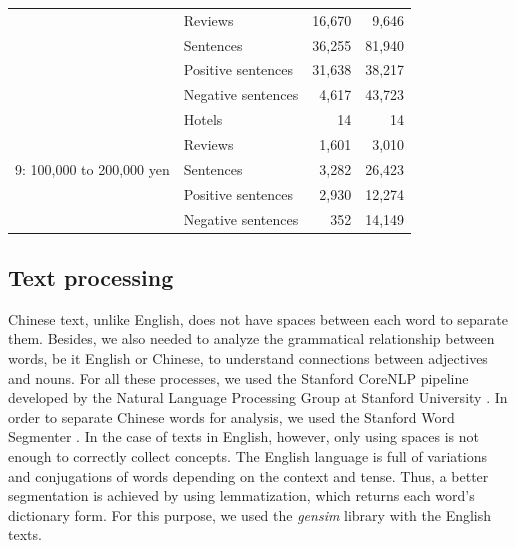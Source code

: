 \documentclass[smallextended,natbib]{svjour3}       %
\begin{document}
\begin{table}[ht]
{\begin{tabular}{|l|l|r|r|}
                                                   & Reviews            & 16,670  & 9,646   \\
                                                   & Sentences          & 36,255  & 81,940  \\
                                                   & Positive sentences & 31,638  & 38,217  \\
                                                   & Negative sentences & 4,617   & 43,723  \\ \hline
        \multirow{5}{*}{9: 100,000 to 200,000 yen}   & Hotels             & 14      & 14      \\
                                                   & Reviews            & 1,601   & 3,010   \\
                                                   & Sentences          & 3,282   & 26,423  \\
                                                   & Positive sentences & 2,930   & 12,274  \\
                                                   & Negative sentences & 352     & 14,149  \\ \hline
        \end{tabular}%
      }
    \end{table}
  \subsection{Text processing}\label{textprocessing}

    Chinese text, unlike English, does not have spaces between each word to separate them. Besides, we also needed to analyze the grammatical relationship between words, be it English or Chinese, to understand connections between adjectives and nouns. For all these processes, we used the Stanford CoreNLP pipeline developed by the Natural Language Processing Group at Stanford University \cite[][]{manning-EtAl:2014:P14-5}. In order to separate Chinese words for analysis, we used the Stanford Word Segmenter \cite[][]{chang2008}. In the case of texts in English, however, only using spaces is not enough to correctly collect concepts. The English language is full of variations and conjugations of words depending on the context and tense. Thus, a better segmentation is achieved by using lemmatization, which returns each word's dictionary form. For this purpose, we used the \textit{gensim} library with the English texts.
\end{document}
